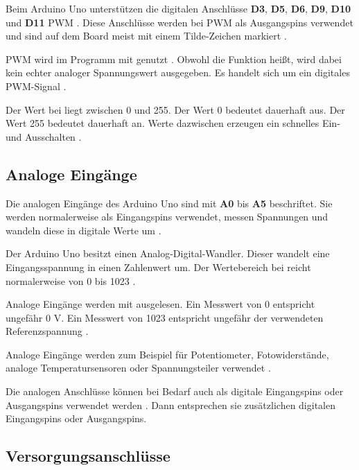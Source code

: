 Beim Arduino Uno unterstützen die digitalen Anschlüsse \textbf{D3}, \textbf{D5}, \textbf{D6}, \textbf{D9}, \textbf{D10} und \textbf{D11} PWM \cite{arduino:uno-r3}\cite{arduino:uno-datasheet}. Diese Anschlüsse werden bei PWM als Ausgangspins verwendet und sind auf dem Board meist mit einem Tilde-Zeichen markiert \cite{arduino:uno-components}.

PWM wird im Programm mit  genutzt \cite{arduino:analogwrite}. Obwohl die Funktion  heißt, wird dabei kein echter analoger Spannungswert ausgegeben. Es handelt sich um ein digitales PWM-Signal \cite{arduino:analogwrite}.

Der Wert bei  liegt zwischen 0 und 255. Der Wert 0 bedeutet dauerhaft aus. Der Wert 255 bedeutet dauerhaft an. Werte dazwischen erzeugen ein schnelles Ein- und Ausschalten \cite{arduino:analogwrite}.



\subsection{Analoge Eingänge}



Die analogen Eingänge des Arduino Uno sind mit \textbf{A0} bis \textbf{A5} beschriftet. Sie werden normalerweise als Eingangspins verwendet, messen Spannungen und wandeln diese in digitale Werte um \cite{arduino:uno-r3}\cite{arduino:analogread}.

Der Arduino Uno besitzt einen Analog-Digital-Wandler. Dieser wandelt eine Eingangsspannung in einen Zahlenwert um. Der Wertebereich bei  reicht normalerweise von 0 bis 1023 \cite{arduino:analogread}.



Analoge Eingänge werden mit  ausgelesen. Ein Messwert von 0 entspricht ungefähr 0 V. Ein Messwert von 1023 entspricht ungefähr der verwendeten Referenzspannung \cite{arduino:analogread}.

Analoge Eingänge werden zum Beispiel für Potentiometer, Fotowiderstände, analoge Temperatursensoren oder Spannungsteiler verwendet \cite{arduino:analogread}.

Die analogen Anschlüsse können bei Bedarf auch als digitale Eingangspins oder Ausgangspins verwendet werden \cite{arduino:uno-datasheet}. Dann entsprechen sie zusätzlichen digitalen Eingangspins oder Ausgangspins.


\subsection{Versorgungsanschlüsse}



